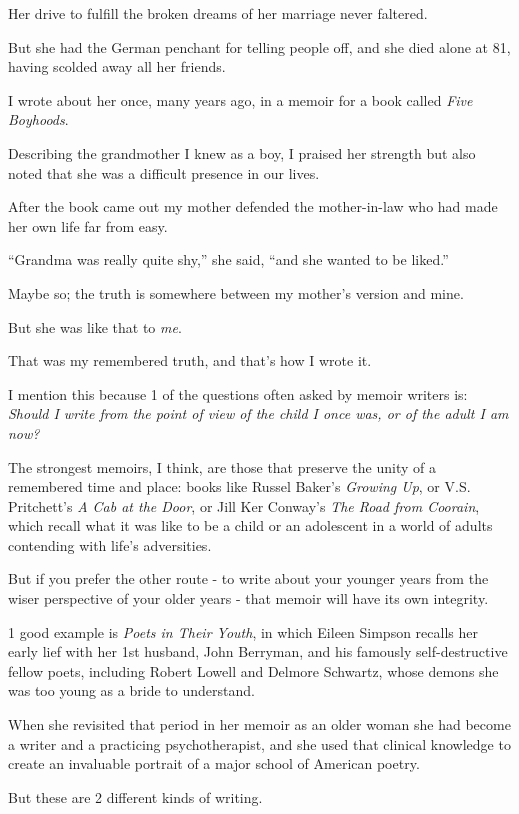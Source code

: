 \documentclass{book}
\numberwithin{equation}{section}
\begin{document}
Her drive to fulfill the broken dreams of her marriage never faltered.

But she had the German penchant for telling people off, and she died alone at 81, having scolded away all her friends.

%
I wrote about her once, many years ago, in a memoir for a book called \textit{Five Boyhoods}.

Describing the grandmother I knew as a boy, I praised her strength but also noted that she was a difficult presence in our lives.

After the book came out my mother defended the mother-in-law who had made her own life far from easy.

``Grandma was really quite shy,'' she said, ``and she wanted to be liked.''

Maybe so; the truth is somewhere between my mother's version and mine.

But she was like that to \textit{me}.

That was my remembered truth, and that's how I wrote it.

%
I mention this because 1 of the questions often asked by memoir writers is: \textit{Should I write from the point of view of the child I once was, or of the adult I am now?}

The strongest memoirs, I think, are those that preserve the unity of a remembered time and place: books like Russel Baker's \textit{Growing Up}, or V.S. Pritchett's \textit{A Cab at the Door}, or Jill Ker Conway's \textit{The Road from Coorain}, which recall what it was like to be a child or an adolescent in a world of adults contending with life's adversities.

%
But if you prefer the other route - to write about your younger years from the wiser perspective of your older years - that memoir will have its own integrity.

1 good example is \textit{Poets in Their Youth}, in which Eileen Simpson recalls her early lief with her 1st husband, John Berryman, and his famously self-destructive fellow poets, including Robert Lowell and Delmore Schwartz, whose demons she was too young as a bride to understand.

When she revisited that period in her memoir as an older woman she had become a writer and a practicing psychotherapist, and she used that clinical knowledge to create an invaluable portrait of a major school of American poetry.

But these are 2 different kinds of writing.
\end{document}
